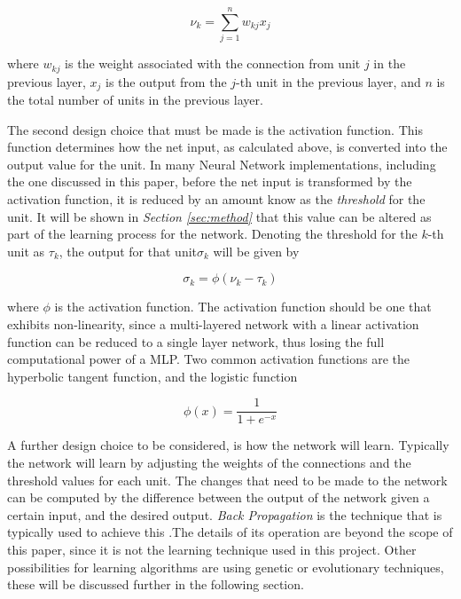 \documentclass{acm_proc_article-sp}
\begin{document}
\begin{equation}
\nu_{k} = \sum\limits_{j = 1}^{n} w_{k j} x_{j}
\label{eqn:one}
\end{equation}

where $w_{k j}$ is the weight associated with the connection from unit $j$ in the previous layer, $x_{j}$ is the output from the $j$-th unit in the previous layer, and $n$ is the total number of units in the previous layer. 

\vspace{3mm}

The second design choice that must be made is the activation function. This function determines how the net input, as calculated above, is converted into the output value for the unit. In many Neural Network implementations, including the one discussed in this paper, before the net input is transformed by the activation function, it is reduced by an amount know as the \textit{threshold} for the unit. It will be shown in \textit{Section \ref{sec:method}} that this value can be altered as part of the learning process for the network. Denoting the threshold for the $k$-th unit as $\tau_{k}$, the output for that unit$\sigma_{k}$ will be given by

\begin{equation}
\sigma_{k} = \phi(\nu_{k} - \tau_{k})
\end{equation}

where $\phi$ is the activation function. The activation function should be one that exhibits non-linearity, since a multi-layered network with a linear activation function can be reduced to a single layer network, thus losing the full computational power of a MLP. Two common activation functions are the hyperbolic tangent function, and the logistic function

\begin{equation}
\label{eqn:logistic}
\phi(x) = \frac{1}{1 + e^{-x}}
\end{equation}

\vspace{3mm}

A further design choice to be considered, is how the network will learn. Typically the network will learn by adjusting the weights of the connections and the threshold values for each unit. The changes that need to be made to the network can be computed by the difference between the output of the network given a certain input, and the desired output. \textit{Back Propagation} is the technique that is typically used to achieve this \cite{bertsekas1995nonlinear}.The details of its operation are beyond the scope of this paper, since it is not the learning technique used in this project. Other possibilities for learning algorithms are using genetic or evolutionary techniques, these will be discussed further in the following section.
\end{document}
